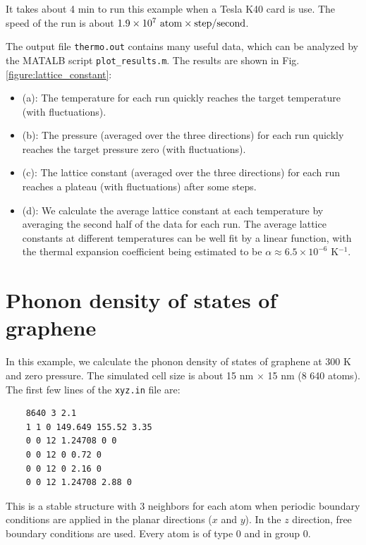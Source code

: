 \documentclass[12pt,a4paper]{report}
\begin{document}
It takes about 4 min to run this example when a Tesla K40 card is use. The speed of the run is about $1.9 \times 10^7 ~\textmd{atom} \times \textmd{step} / \textmd{second}$.

The output file \verb"thermo.out" contains many useful data, which can be analyzed by the MATALB script \verb"plot_results.m". The results are shown in Fig. \ref{figure:lattice_constant}:
\begin{itemize}
\item (a): The temperature for each run quickly reaches the target temperature (with fluctuations).
\item (b): The pressure (averaged over the three directions) for each run quickly reaches the target pressure zero (with fluctuations).
\item (c): The lattice constant (averaged over the three directions) for each run reaches a plateau (with fluctuations) after some steps.
\item (d): We calculate the average lattice constant at each temperature by averaging the second half of the data for each run. The average lattice constants at different temperatures can be well fit by a linear function, with the thermal expansion coefficient being estimated to be $\alpha \approx 6.5\times10^{-6}$ K$^{-1}$.
\end{itemize}


\section{Phonon density of states of graphene}


In this example, we calculate the phonon density of states of graphene at 300 K
and zero pressure. The simulated cell size is about 15 nm $\times$ 15 nm (8 640 atoms).
The first few lines of the \verb"xyz.in" file are:
\begin{verbatim}
    8640 3 2.1
    1 1 0 149.649 155.52 3.35
    0 0 12 1.24708 0 0
    0 0 12 0 0.72 0
    0 0 12 0 2.16 0
    0 0 12 1.24708 2.88 0
\end{verbatim}
This is a stable structure with 3 neighbors for each atom when periodic boundary conditions are applied in the planar directions ($x$ and $y$). In the $z$ direction, free boundary conditions are used. Every atom is of type 0 and in group 0.
\end{document}
